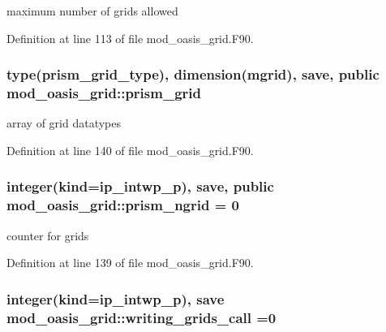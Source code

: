 maximum number of grids allowed 



Definition at line 113 of file mod\+\_\+oasis\+\_\+grid.\+F90.

\hypertarget{classmod__oasis__grid_a43b75282e77fd687bd7173f4f78abcb1}{
\subsubsection[{prism\+\_\+grid}]{\setlength{\rightskip}{0pt plus 5cm}type({\bf prism\+\_\+grid\+\_\+type}), dimension({\bf mgrid}), save, public mod\+\_\+oasis\+\_\+grid\+::prism\+\_\+grid}}\label{classmod__oasis__grid_a43b75282e77fd687bd7173f4f78abcb1}


array of grid datatypes 



Definition at line 140 of file mod\+\_\+oasis\+\_\+grid.\+F90.

\hypertarget{classmod__oasis__grid_ad6e65eb9872825ac98db6ce1f7dcd618}{
\subsubsection[{prism\+\_\+ngrid}]{\setlength{\rightskip}{0pt plus 5cm}integer(kind=ip\+\_\+intwp\+\_\+p), save, public mod\+\_\+oasis\+\_\+grid\+::prism\+\_\+ngrid = 0}}\label{classmod__oasis__grid_ad6e65eb9872825ac98db6ce1f7dcd618}


counter for grids 



Definition at line 139 of file mod\+\_\+oasis\+\_\+grid.\+F90.

\hypertarget{classmod__oasis__grid_a587c160986cc015e4367b1cca13babfb}{
\subsubsection[{writing\+\_\+grids\+\_\+call}]{\setlength{\rightskip}{0pt plus 5cm}integer(kind=ip\+\_\+intwp\+\_\+p), save mod\+\_\+oasis\+\_\+grid\+::writing\+\_\+grids\+\_\+call =0\hspace{0.3cm}{\ttfamily [private]}}}\label{classmod__oasis__grid_a587c160986cc015e4367b1cca13babfb}


